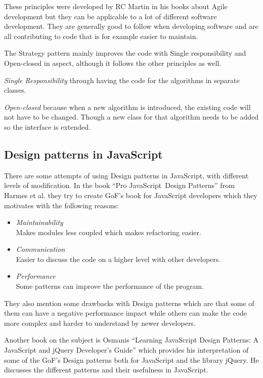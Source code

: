 \documentclass[conference, a4paper]{IEEEtran}
\begin{document}
These principles were developed by RC Martin in his books about Agile development but they can be applicable to a lot of different software development. They are generally good to follow when developing software and are all contributing to code that is for example easier to maintain.~\cite{bibitem:Bob}

The Strategy pattern mainly improves the code with Single responsibility and Open-closed in aspect, although it follows the other principles as well.

\textit{Single Responsibility} through having the code for the algorithms in separate classes.

\textit{Open-closed} because when a new algorithm is introduced, the existing code will not have to be changed. Though a new class for that algorithm needs to be added so the interface is extended.

\subsection{Design patterns in JavaScript}
There are some attempts of using Design patterns in JavaScript, with different levels of modification. In the book ``Pro JavaScript\texttrademark~Design Patterns'' from Harmes et al. they try to create GoF's book for JavaScript developers which they motivates with the following reasons:
\begin{itemize}
    \item \emph{Maintainability} \\
		Makes modules less coupled which makes refactoring easier.
    \item \emph{Communication} \\
		Easier to discuss the code on a higher level with other developers.
    \item \emph{Performance} \\
    Some patterns can improve the performance of the program.
\end{itemize}
They also mention some drawbacks with Design patterns which are that some of them can have a negative performance impact while others can make the code more complex and harder to understand by newer developers.~\cite{bibitem:DiazHarmes}

Another book on the subject is Osmanis ``Learning JavaScript Design Patterns: A JavaScript and jQuery Developer's Guide'' which provides his interpretation of some of the GoF's Design patterns both for JavaScript and the library jQuery. He discusses the different patterns and their usefulness in JavaScript.~\cite{bibitem:Osmani}
\end{document}
